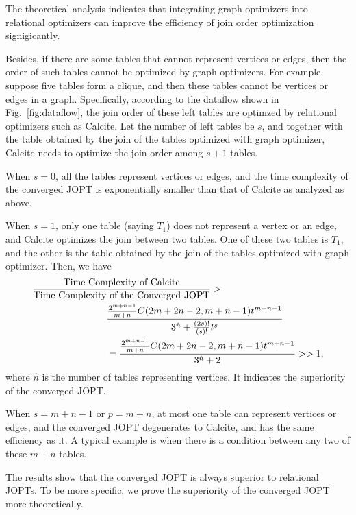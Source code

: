 \documentclass[sigconf, nonacm]{acmart}
\begin{document}
The theoretical analysis indicates that integrating graph optimizers into relational optimizers can improve the efficiency of join order optimization signigicantly.

Besides, if there are some tables that cannot represent vertices or edges, then the order of such tables cannot be optimized by graph optimizers.
For example, suppose five tables form a clique, and then these tables cannot be vertices or edges in a graph.
Specifically, according to the dataflow shown in Fig.~\ref{fig:dataflow}, the join order of these left tables are optimzed by relational optimizers such as Calcite.
Let the number of left tables be $s$, and together with the table obtained by the join of the tables optimized with graph optimizer, Calcite needs to optimize the join order among $s + 1$ tables.

When $s = 0$, all the tables represent vertices or edges, and the time complexity of the converged JOPT is exponentially smaller than that of Calcite as analyzed as above.

When $s = 1$, only one table (saying $T_1$) does not represent a vertex or an edge, and Calcite optimizes the join between two tables.
One of these two tables is $T_1$, and the other is the table obtained by the join of the tables optimized with graph optimizer.
Then, we have
\begin{equation*}
    \begin{split}
        \frac{\text{Time Complexity of Calcite}}{\text{Time Complexity of the Converged JOPT}} > \hspace{-12em} & \\
        & \frac{\frac{2^{m+n-1}}{m+n}C(2m+2n-2, m+n-1)t^{m + n - 1}}{3^{\hat{n}} + \frac{(2s)!}{(s)!}t^{s}} \\
        & = \frac{\frac{2^{m+n-1}}{m+n}C(2m+2n-2, m+n-1)t^{m + n - 1}}{3^{\hat{n}} + 2} >> 1,
    \end{split}
\end{equation*}
where $\hat{n}$ is the number of tables representing vertices.
It indicates the superiority of the converged JOPT.

When $s = m + n - 1$ or $p = m + n$, at most one table can represent vertices or edges, and the converged JOPT degenerates to Calcite, and has the same efficiency as it.
A typical example is when there is a condition between any two of these $m + n$ tables.

The results show that the converged JOPT is always superior to relational JOPTs.
To be more specific, we prove the superiority of the converged JOPT more theoretically.
\end{document}
